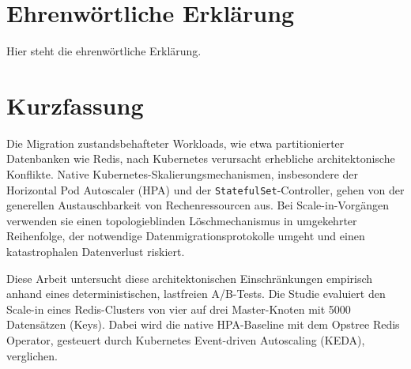 \documentclass[12pt,a4paper]{report}
\begin{document}


\pagestyle{plain}


\newpage
{}
\section*{Ehrenwörtliche Erklärung}
Hier steht die ehrenwörtliche Erklärung.




\newpage
{}
\section*{Kurzfassung}
Die Migration zustandsbehafteter Workloads, wie etwa partitionierter Datenbanken wie Redis, nach Kubernetes verursacht erhebliche architektonische Konflikte. Native Kubernetes-Skalierungsmechanismen, insbesondere der Horizontal Pod Autoscaler (HPA) und der \texttt{StatefulSet}-Controller, gehen von der generellen Austauschbarkeit von Rechenressourcen aus. Bei Scale-in-Vorgängen verwenden sie einen topologieblinden Löschmechanismus in umgekehrter Reihenfolge, der notwendige Datenmigrationsprotokolle umgeht und einen katastrophalen Datenverlust riskiert.

Diese Arbeit untersucht diese architektonischen Einschränkungen empirisch anhand eines deterministischen, lastfreien A/B-Tests. Die Studie evaluiert den Scale-in eines Redis-Clusters von vier auf drei Master-Knoten mit \num{5000} Datensätzen (Keys). Dabei wird die native HPA-Baseline mit dem Opstree Redis Operator, gesteuert durch Kubernetes Event-driven Autoscaling (KEDA), verglichen.
\end{document}
